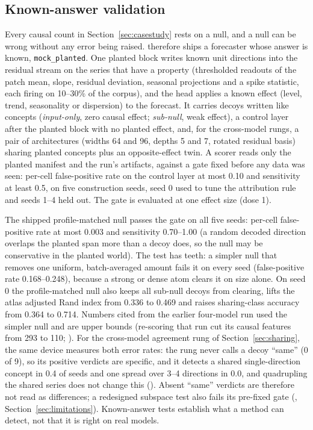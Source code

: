 \subsection{Known-answer validation}
\label{sec:knownanswer}

Every causal count in Section~\ref{sec:casestudy} rests on a null, and a null can be wrong without any error being
raised. \tool{} therefore ships a forecaster whose answer is known, \texttt{mock\_planted}. One planted block writes
known unit directions into the residual stream on the series that have a property (thresholded readouts of the patch
mean, slope, residual deviation, seasonal projections and a spike statistic, each firing on 10--30\% of the corpus),
and the head applies a known effect (level, trend, seasonality or dispersion) to the forecast. It carries decoys
written like concepts (\emph{input-only}, zero causal effect; \emph{sub-null}, weak effect), a control layer after the
planted block with no planted effect, and, for the cross-model rungs, a pair of architectures (widths 64 and 96, depths
5 and 7, rotated residual basis) sharing planted concepts plus an opposite-effect twin. A scorer reads only the planted manifest and the run's artifacts, against a gate fixed before any
data was seen: per-cell false-positive rate on the control layer at most 0.10 and sensitivity at least 0.5, on five
construction seeds, seed 0 used to tune the attribution rule and seeds 1--4 held out. The gate is evaluated at one effect
size (dose 1).


The shipped profile-matched null passes the gate on all five seeds: per-cell false-positive rate at most 0.003 and
sensitivity 0.70--1.00 (a random decoded direction overlaps the planted span more than a decoy does, so the null may be
conservative in the planted world). The test has teeth: a simpler null that removes one uniform, batch-averaged amount
fails it on every seed (false-positive rate 0.168--0.248), because a strong or dense atom clears it on size alone. On
seed 0 the profile-matched null also keeps all sub-null decoys from clearing, lifts the atlas adjusted Rand index from
0.336 to 0.469 and raises sharing-class accuracy from 0.364 to 0.714. Numbers cited from the earlier four-model run
used the simpler null and are upper bounds (re-scoring that run cut its causal features from 293 to 110;
). For the cross-model agreement rung of Section~\ref{sec:sharing}, the same device measures both error
rates: the rung never calls a decoy ``same'' (0 of 9), so its positive verdicts are specific, and it detects a shared
single-direction concept in 0.4 of seeds and one spread over 3--4 directions in 0.0, and quadrupling the shared series does not change this
(). Absent ``same'' verdicts are therefore not read as differences; a redesigned subspace test also fails its pre-fixed gate
(, Section~\ref{sec:limitations}). Known-answer tests establish
what a method can detect, not that it is right on real models.
